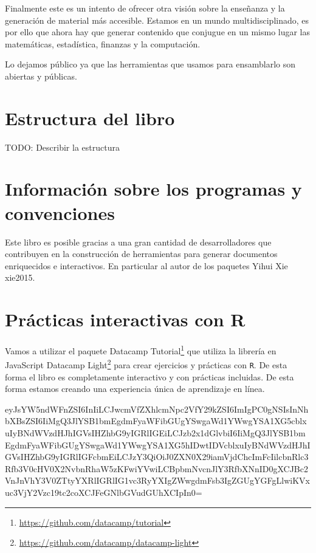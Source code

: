 \documentclass[
  12pt,
]{krantz}
\renewcommand{\href}[2]{#2\footnote{\url{#1}}}
\begin{document}
Finalmente este es un intento de ofrecer otra visión sobre la enseñanza y la generación de material más accesible. Estamos en un mundo multidisciplinado, es por ello que ahora hay que generar contenido que conjugue en un mismo lugar las matemáticas, estadística, finanzas y la computación.

Lo dejamos público ya que las herramientas que usamos para ensamblarlo son abiertas y públicas.

\hypertarget{estructura-del-libro}{%
\section*{Estructura del libro}\label{estructura-del-libro}}


TODO: Describir la estructura

\hypertarget{informacion-sobre-los-programas-y-convenciones}{%
\section*{Información sobre los programas y convenciones}\label{informacion-sobre-los-programas-y-convenciones}}


Este libro es posible gracias a una gran cantidad de desarrolladores que contribuyen en la construcción de herramientas para generar documentos enriquecidos e interactivos. En particular al autor de los paquetes Yihui Xie xie2015.

\hypertarget{practicas-interactivas-con-r}{%
\section*{Prácticas interactivas con R}\label{practicas-interactivas-con-r}}


Vamos a utilizar el paquete \href{https://github.com/datacamp/tutorial}{Datacamp Tutorial} que utiliza la librería en JavaScript \href{https://github.com/datacamp/datacamp-light}{Datacamp Light} para crear ejercicios y prácticas con \texttt{R}. De esta forma el libro es completamente interactivo y con prácticas incluidas. De esta forma estamos creando una experiencia única de aprendizaje en línea.

eyJsYW5ndWFnZSI6InIiLCJwcmVfZXhlcmNpc2VfY29kZSI6ImIgPC0gNSIsInNhbXBsZSI6IiMgQ3JlYSB1bmEgdmFyaWFibGUgYSwgaWd1YWwgYSA1XG5cblxuIyBNdWVzdHJhIGVsIHZhbG9yIGRlIGEiLCJzb2x1dGlvbiI6IiMgQ3JlYSB1bmEgdmFyaWFibGUgYSwgaWd1YWwgYSA1XG5hIDwtIDVcblxuIyBNdWVzdHJhIGVsIHZhbG9yIGRlIGFcbmEiLCJzY3QiOiJ0ZXN0X29iamVjdChcImFcIilcbnRlc3Rfb3V0cHV0X2NvbnRhaW5zKFwiYVwiLCBpbmNvcnJlY3RfbXNnID0gXCJBc2VnJnVhY3V0ZTtyYXRlIGRlIG1vc3RyYXIgZWwgdmFsb3IgZGUgYGFgLlwiKVxuc3VjY2Vzc19tc2coXCJFeGNlbGVudGUhXCIpIn0=
\end{document}
